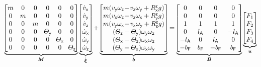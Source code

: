 \begin{align}\label{eq:QuadcopterKinetics}
 \underbrace{\!\begin{bmatrix}
  m & 0 & 0 & 0 & 0 & 0 \\
  0 & m & 0 & 0 & 0 & 0 \\
  0 & 0 & m & 0 & 0 & 0 \\
  0 & 0 & 0 & \!\Jy\! & 0 & 0 \\
  0 & 0 & 0 & 0 & \!\Jx\! & 0 \\
  0 & 0 & 0 & 0 & 0 & \!\Jz\! \\
  \end{bmatrix}\!}_{\sysInertiaMat}
 \underbrace{\!\begin{bmatrix} \vxd \\ \vyd \\ \vzd \\ \wxd \\ \wyd \\ \wzd \end{bmatrix}\!}_{\sysVeld}
 +
 \underbrace{\!\begin{bmatrix}
  m (\vy\wz \!-\! \vz\wy + \Rzx\gravityAccConst) \\
  m (\vx\wz \!-\! \vz\wx + \Rzy\gravityAccConst) \\
  m (\vy\wx \!-\! \vx\wy + \Rzz\gravityAccConst) \\
  (\Jz-\Jy)\wy\wz \\
  (\Jx-\Jz)\wx\wz \\
  (\Jy-\Jx)\wx\wy \\
 \end{bmatrix}\!}_{\sysForce}
 =
 \underbrace{\!\begin{bmatrix}
  0 & 0 & 0 & 0 \\
  0 & 0 & 0 & 0 \\
  1 & 1 & 1 & 1 \\
  0 & \ArmRadius & 0 & -\ArmRadius \\
  -\ArmRadius & 0 & \ArmRadius & 0 \\
  -\PropTorqueFaktor & \PropTorqueFaktor & -\PropTorqueFaktor & \PropTorqueFaktor \\
 \end{bmatrix}\!}_{\sysInputMat}
 \underbrace{\!\begin{bmatrix} \PropForce[1] \\ \PropForce[2] \\ \PropForce[3] \\ \PropForce[4] \end{bmatrix}\!}_{\sysInput}
\end{align}

